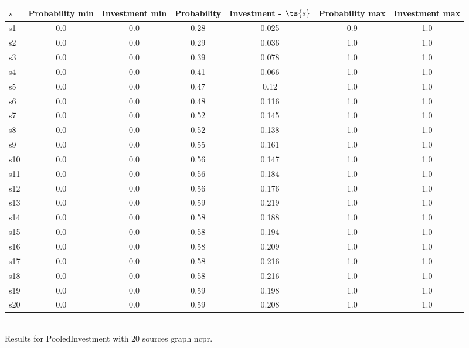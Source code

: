 \documentclass{article}
\begin{document}
\noindent\begin{tabular}{|l|c|c|c|c|c|c|}
\hline
$s$& Probability min & Investment min & Probability & Investment - $\ts{s}$ & Probability max & Investment max\\
\hline
s1 &0.0 & 0.0 & 0.28 & 0.025 & 0.9 & 1.0\\
\hline
s2 &0.0 & 0.0 & 0.29 & 0.036 & 1.0 & 1.0\\
\hline
s3 &0.0 & 0.0 & 0.39 & 0.078 & 1.0 & 1.0\\
\hline
s4 &0.0 & 0.0 & 0.41 & 0.066 & 1.0 & 1.0\\
\hline
s5 &0.0 & 0.0 & 0.47 & 0.12 & 1.0 & 1.0\\
\hline
s6 &0.0 & 0.0 & 0.48 & 0.116 & 1.0 & 1.0\\
\hline
s7 &0.0 & 0.0 & 0.52 & 0.145 & 1.0 & 1.0\\
\hline
s8 &0.0 & 0.0 & 0.52 & 0.138 & 1.0 & 1.0\\
\hline
s9 &0.0 & 0.0 & 0.55 & 0.161 & 1.0 & 1.0\\
\hline
s10 &0.0 & 0.0 & 0.56 & 0.147 & 1.0 & 1.0\\
\hline
s11 &0.0 & 0.0 & 0.56 & 0.184 & 1.0 & 1.0\\
\hline
s12 &0.0 & 0.0 & 0.56 & 0.176 & 1.0 & 1.0\\
\hline
s13 &0.0 & 0.0 & 0.59 & 0.219 & 1.0 & 1.0\\
\hline
s14 &0.0 & 0.0 & 0.58 & 0.188 & 1.0 & 1.0\\
\hline
s15 &0.0 & 0.0 & 0.58 & 0.194 & 1.0 & 1.0\\
\hline
s16 &0.0 & 0.0 & 0.58 & 0.209 & 1.0 & 1.0\\
\hline
s17 &0.0 & 0.0 & 0.58 & 0.216 & 1.0 & 1.0\\
\hline
s18 &0.0 & 0.0 & 0.58 & 0.216 & 1.0 & 1.0\\
\hline
s19 &0.0 & 0.0 & 0.59 & 0.198 & 1.0 & 1.0\\
\hline
s20 &0.0 & 0.0 & 0.59 & 0.208 & 1.0 & 1.0\\
\hline
\end{tabular}\\

\noindent Results for PooledInvestment with 20 sources graph ncpr.
\end{document}
